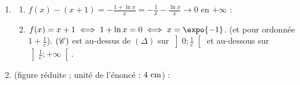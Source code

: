 \begin{description}
\begin{enumerate}
\begin{enumerate}
               \item {}
                  En $0^+$ : $1 + \ln x \to -\infty$ et $\frac{1}{x} \to +\infty$, donc $-\frac{1 + \ln x}{x} \to +\infty$ :
                  \par\noindent{} (asymptote verticale $x = 0$).
                  En $+\infty$ : $\frac{1}{x} \to 0$ et $\frac{\ln x}{x} \to 0$, donc 
               \item {}
                  Avec $\ln\alpha = -\alpha^2$ : $f(\alpha) = \alpha + 1 - \frac{1 - \alpha^2}{\alpha} = 2\alpha + 1 - \frac{1}{\alpha} \simeq 0{,}77$.
                  \[
                     \begin{array}{c|ccccc}
                        x & 0 & & \alpha & & +\infty \\ \hline
                        f'(x) & & - & 0 & + & \\ \hline
                        & +\infty & & & & +\infty \\
                        f & & \searrow & & \nearrow & \\
                        & & & f(\alpha) & &
                     \end{array}
                  \]
            \end{enumerate}
         \item
            \begin{enumerate}
               \item {}
                  $f(x) - (x + 1) = -\frac{1 + \ln x}{x} = -\frac{1}{x} - \frac{\ln x}{x} \to 0$ en $+\infty$ :
                  \par\noindent{}
               \item {}
                  $f(x) = x + 1 \iff 1 + \ln x = 0 \iff x = \expo{-1}$.  (et pour ordonn\'ee $1 + \frac{1}{e}$).
                  $(\mathscr{C})$ est au-dessus de $(\Delta)$ sur $\left]0 ; \frac{1}{e}\right[$ et au-dessous sur $\left]\frac{1}{e} ; +\infty\right[$.
            \end{enumerate}
         \item {} (figure r\'eduite ; unit\'e de l'\'enonc\'e : $4~\mathrm{cm}$) :
            \begin{center}
            \begin{tikzpicture}[scale=1.6,>=stealth]

\end{tikzpicture}
\end{center}
\end{enumerate}
\end{description}

